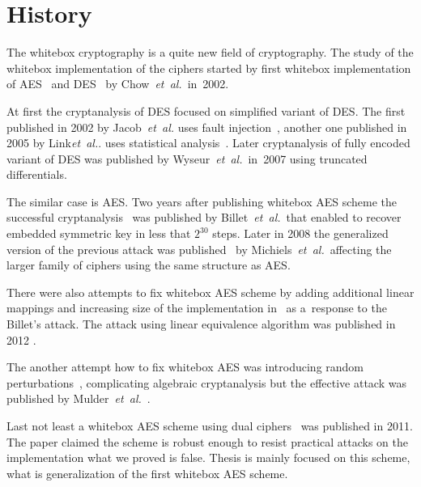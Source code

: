 \documentclass[11pt,oneside,final]{fithesis2}
\newcommand{\eal}{\emph{et~al.}}
\begin{document}
    \section{History}
    
    The whitebox cryptography is a quite new field of cryptography. The study of the whitebox implementation of the ciphers started by first 
    whitebox implementation of AES~\citep{Chow02white-boxcryptography} and DES~\citep{Chow02awhite-box} by Chow~\eal~in~2002. 
    
    At first the cryptanalysis of DES focused on simplified variant of DES. The first published in 2002 by Jacob~\eal
    uses fault injection~\citep{conf/ccs/JacobBF02}, another one published in 2005 by Link\eal. uses statistical analysis~\citep{Link:2005:COI:1058430.1059147}.
    Later cryptanalysis of fully encoded variant of DES was published by Wyseur~\eal~in~2007 using truncated differentials.
   
    The similar case is AES. Two years after publishing whitebox AES scheme the successful cryptanalysis~\citep{Billet:2004:CWB:2080787.2080809} was
    published by Billet~\eal~that enabled to recover embedded symmetric 
    key in less that $2^{30}$ steps. Later in 2008 the generalized version of the previous attack
    was published~\citep{Michiels:2007:MST:1314276.1314291} by Michiels~\eal~affecting the larger family of ciphers using the same structure as AES.   
   
    There were also attempts to fix whitebox AES scheme by adding additional linear mappings and increasing size of the implementation in~\citep{XiaoLai}
    as a~response to the Billet's attack.
    The attack using linear equivalence algorithm was published in 2012 \cite{conf/sacrypt/MulderRP12}.
    
    The another attempt how to fix whitebox AES was introducing random perturbations~\citep{journals/iacr/BringerCD06a}, 
    complicating algebraic cryptanalysis but the effective attack was published by Mulder~\eal~\citep{conf/indocrypt/MulderWP10}.
    
    Last not least a whitebox AES scheme using dual ciphers~\citep{Karroumi:2010:PWA:2041036.2041060} was published in 2011. The paper claimed 
    the scheme is robust enough to resist practical attacks on the implementation what we proved is false. 
    Thesis is mainly focused on this scheme, what is generalization of the first whitebox AES scheme. 
    
\end{document}
